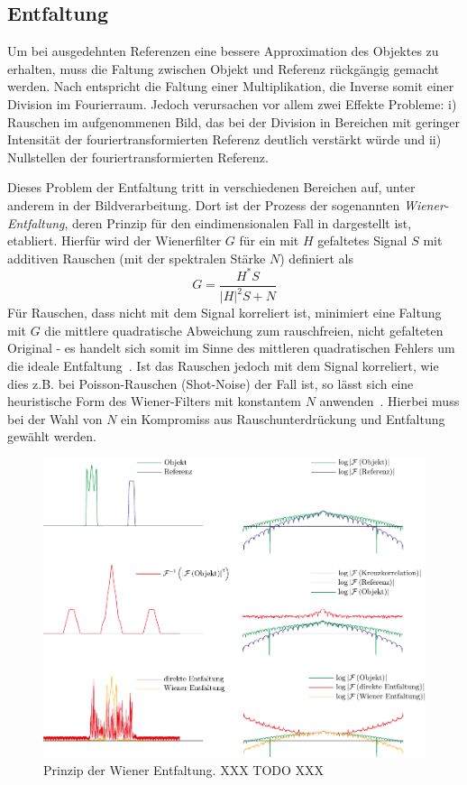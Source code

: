 \subsection{Entfaltung}
Um bei ausgedehnten Referenzen eine bessere Approximation des Objektes zu erhalten, muss die Faltung zwischen Objekt und Referenz rückgängig gemacht werden. Nach  entspricht die Faltung einer Multiplikation, die Inverse somit einer Division im Fourierraum. Jedoch verursachen vor allem zwei Effekte Probleme: i) Rauschen im aufgenommenen Bild, das bei der Division in Bereichen mit geringer Intensität der fouriertransformierten Referenz deutlich verstärkt würde und ii) Nullstellen der fouriertransformierten Referenz. 

Dieses Problem der Entfaltung tritt in verschiedenen Bereichen auf, unter anderem in der Bildverarbeitung.
Dort ist der Prozess der sogenannten \textit{Wiener-Entfaltung}, deren Prinzip für den eindimensionalen Fall in  dargestellt ist, etabliert. Hierfür wird der Wienerfilter $G$ für ein mit $H$ gefaltetes Signal $S$ mit additiven Rauschen (mit der spektralen Stärke $N$) definiert als
\begin{equation}
	G=\frac{H^* S}{\left|H\right|^2 S+N}
\end{equation}
Für Rauschen, dass nicht mit dem Signal korreliert ist, minimiert eine Faltung mit $G$ die mittlere quadratische Abweichung zum rauschfreien, nicht gefalteten Original - es handelt sich somit im Sinne des mittleren quadratischen Fehlers um die ideale Entfaltung~\cite{castleman1996}. Ist das Rauschen jedoch mit dem Signal korreliert, wie dies z.B. bei Poisson-Rauschen (Shot-Noise) der Fall ist, so lässt sich eine heuristische Form des Wiener-Filters mit konstantem $N$ anwenden~\cite{he2004}. Hierbei muss bei der Wahl von $N$ ein Kompromiss aus Rauschunterdrückung und Entfaltung gewählt werden.

\begin{figure}
	\centering
	\includegraphics[width=.75\textwidth]{images/wiener.pdf}
	\caption[Prinzip Wiener-Enfaltung]{Prinzip der Wiener Entfaltung. XXX TODO  XXX}
	\label{fig:wiener}
\end{figure} 

